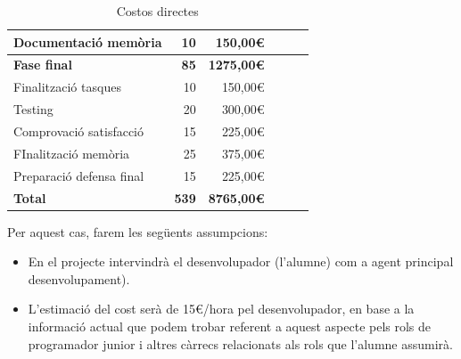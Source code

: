 \begin{table}[htb]
{\begin{tabular}{lrrrrr}
Documentació memòria                         & 10                                                                                       & 150,00\euro                                        \\
\hline
\textbf{Fase final}                          & \textbf{85}                                                                   & \textbf{1275,00\euro}                              \\
\hline
Finalització tasques                         & 10                                                                                     & 150,00\euro                                        \\
Testing                                      & 20                                                                                      & 300,00\euro                                        \\
Comprovació satisfacció                      & 15                                                                                      & 225,00\euro                                        \\
FInalització memòria                         & 25                                                                                     & 375,00\euro                                        \\
Preparació defensa final                     & 15                                                                                     & 225,00\euro                                        \\
\hline
\textbf{Total}                               & \textbf{539}                                                                 & \textbf{8765,00\euro}       \\
\hline                      
\end{tabular}}
\caption{Costos directes}
\end{table}

Per aquest cas, farem les següents assumpcions:

\begin{itemize}
\item En el projecte intervindrà el desenvolupador (l'alumne) com a agent principal desenvolupament).
\item L'estimació del cost serà de 15\euro /hora pel desenvolupador, en base a la informació actual que podem trobar referent a aquest aspecte pels rols de programador junior i altres càrrecs relacionats als rols que l'alumne assumirà.
\end{itemize}


